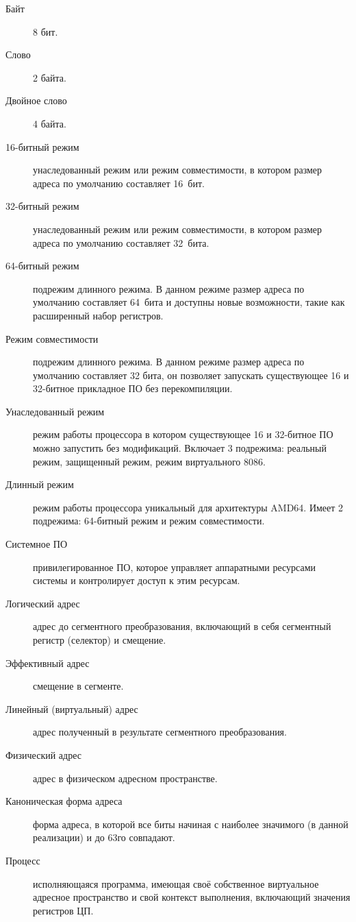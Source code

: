 \Defines
\begin{description}
\item[Байт] 8 бит.
\item[Слово] 2 байта.
\item[Двойное слово] 4 байта.
\item[16-битный режим] унаследованный режим или режим совместимости, в котором размер адреса по умолчанию составляет 16~бит.
\item[32-битный режим] унаследованный режим или режим совместимости, в котором размер адреса по умолчанию составляет 32~бита.
\item[64-битный режим] подрежим длинного режима. В данном режиме размер адреса по умолчанию составляет 64~бита и доступны
новые возможности, такие как расширенный набор регистров.
\item[Режим совместимости] подрежим длинного режима. В данном режиме размер адреса по умолчанию составляет 32 бита, он
позволяет запускать существующее 16 и 32-битное прикладное ПО без перекомпиляции.
\item[Унаследованный режим] режим работы процессора в котором существующее 16 и 32-битное ПО можно запустить без модификаций.
Включает 3 подрежима: реальный режим, защищенный режим, режим виртуального 8086.
\item[Длинный режим] режим работы процессора уникальный для архитектуры AMD64. Имеет 2 подрежима: 64-битный режим и
режим совместимости.
\item[Системное ПО] привилегированное ПО, которое управляет аппаратными ресурсами системы и контролирует доступ к этим ресурсам.
\item[Логический адрес] адрес до сегментного преобразования, включающий в себя сегментный регистр (селектор) и смещение.
\item[Эффективный адрес] смещение в сегменте.
\item[Линейный (виртуальный) адрес] адрес полученный в результате сегментного преобразования.
\item[Физический адрес] адрес в физическом адресном пространстве.
\item[Каноническая форма адреса] форма адреса, в которой все биты начиная с наиболее значимого (в данной реализации) и до 63го совпадают.
\item[Процесс] исполняющаяся программа, имеющая своё собственное
	виртуальное адресное пространство и свой контекст выполнения, включающий значения регистров ЦП.
\end{description}
